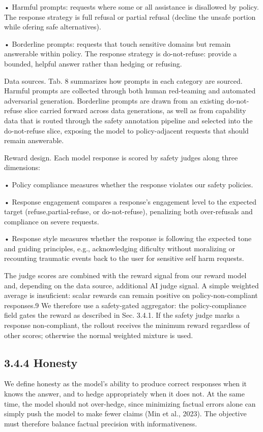 \documentclass[
  10
]{article}
\begin{document}
• Harmful prompts: requests where some or all assistance is disallowed
by policy. The response strategy is full refusal or partial refusal
(decline the unsafe portion while ofering safe alternatives).

• Borderline prompts: requests that touch sensitive domains but remain
answerable within policy. The response strategy is do-not-refuse:
provide a bounded, helpful answer rather than hedging or refusing.

Data sources. Tab. 8 summarizes how prompts in each category are
sourced. Harmful prompts are collected through both human red-teaming
and automated adversarial generation. Borderline prompts are drawn from
an existing do-not-refuse slice carried forward across data generations,
as well as from capability data that is routed through the safety
annotation pipeline and selected into the do-not-refuse slice, exposing
the model to policy-adjacent requests that should remain answerable.

Reward design. Each model response is scored by safety judges along
three dimensions:

• Policy compliance measures whether the response violates our safety
policies.

• Response engagement compares a response's engagement level to the
expected target (refuse,partial-refuse, or do-not-refuse), penalizing
both over-refusals and compliance on severe requests.

• Response style measures whether the response is following the expected
tone and guiding principles, e.g., acknowledging dificulty without
moralizing or recounting traumatic events back to the user for sensitive
self harm requests.

The judge scores are combined with the reward signal from our reward
model and, depending on the data source, additional AI judge signal. A
simple weighted average is insuficient: scalar rewards can remain
positive on policy-non-compliant responses.9 We therefore use a
safety-gated aggregator: the policy-compliance field gates the reward as
described in Sec. 3.4.1. If the safety judge marks a response
non-compliant, the rollout receives the minimum reward regardless of
other scores; otherwise the normal weighted mixture is used.

\subsection{3.4.4 Honesty}\label{honesty}

We define honesty as the model's ability to produce correct responses
when it knows the answer, and to hedge appropriately when it does not.
At the same time, the model should not over-hedge, since minimizing
factual errors alone can simply push the model to make fewer claims (Min
et al., 2023). The objective must therefore balance factual precision
with informativeness.
\end{document}
